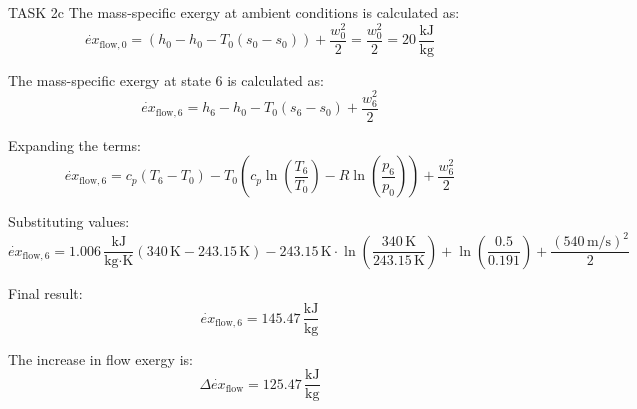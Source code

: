 TASK 2c  
The mass-specific exergy at ambient conditions is calculated as:  
\[
\dot{ex}_{\text{flow},0} = (h_0 - h_0 - T_0(s_0 - s_0)) + \frac{w_0^2}{2} = \frac{w_0^2}{2} = 20 \, \frac{\text{kJ}}{\text{kg}}
\]

The mass-specific exergy at state 6 is calculated as:  
\[
\dot{ex}_{\text{flow},6} = h_6 - h_0 - T_0(s_6 - s_0) + \frac{w_6^2}{2}
\]

Expanding the terms:  
\[
\dot{ex}_{\text{flow},6} = c_p(T_6 - T_0) - T_0 \left( c_p \ln \left( \frac{T_6}{T_0} \right) - R \ln \left( \frac{p_6}{p_0} \right) \right) + \frac{w_6^2}{2}
\]

Substituting values:  
\[
\dot{ex}_{\text{flow},6} = 1.006 \, \frac{\text{kJ}}{\text{kg·K}} \left( 340 \, \text{K} - 243.15 \, \text{K} \right) - 243.15 \, \text{K} \cdot \ln \left( \frac{340 \, \text{K}}{243.15 \, \text{K}} \right) + \ln \left( \frac{0.5}{0.191} \right) + \frac{(540 \, \text{m/s})^2}{2}
\]

Final result:  
\[
\dot{ex}_{\text{flow},6} = 145.47 \, \frac{\text{kJ}}{\text{kg}}
\]

The increase in flow exergy is:  
\[
\Delta \dot{ex}_{\text{flow}} = 125.47 \, \frac{\text{kJ}}{\text{kg}}
\]